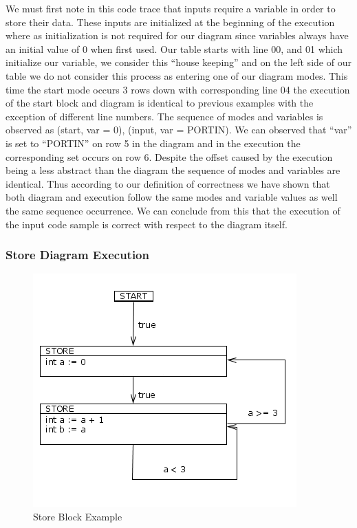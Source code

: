 We must first note in this code trace that inputs require a variable in order to store
their data. These inputs are initialized at the beginning of the execution where as 
initialization is not required for our diagram since variables always have an initial
value of 0 when first used. Our table starts with line 00, and 01 which initialize 
our variable, we consider this ``house keeping'' and on the left side of our table we
do not consider this process as entering one of our diagram modes. This time the start
mode occurs 3 rows down with corresponding line 04 the execution of the start block 
and diagram is identical to previous examples with the exception of different line numbers.
The sequence of modes and variables is observed as {(start, var = 0), (input, var = PORTIN)}.
We can observed that ``var'' is set to ``PORTIN'' on row 5 in the diagram and in the 
execution the corresponding set occurs on row 6. Despite the offset caused by the execution
being a less abstract than the diagram the sequence of modes and variables are identical.
Thus according to our definition of correctness we have shown that both diagram
and execution follow the same modes and variable values as well the same sequence
occurrence. We can conclude from this that the execution of the input code sample is correct
with respect to the diagram itself.

\subsubsection{Store Diagram Execution}

\begin{figure}[h]
	\centering
	\includegraphics[width=\imgmedphoto]{./images/correctness_ex_store.png}
	\caption{Store Block Example}
	\label{fig:correctness_ex_store}
\end{figure}


